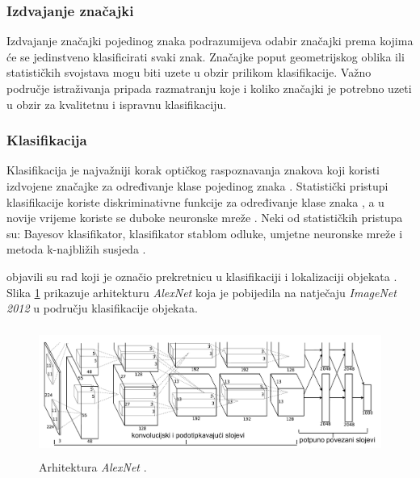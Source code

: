 \documentclass[times, utf8, zavrsni]{fer}
\begin{document}
\pagebreak

\subsubsection{Izdvajanje značajki}
Izdvajanje značajki pojedinog znaka podrazumijeva odabir značajki prema kojima
će se jedinstveno klasificirati svaki znak. Značajke poput geometrijskog oblika
ili statističkih svojstava mogu biti uzete u obzir prilikom klasifikacije.
Važno područje istraživanja pripada razmatranju koje i koliko značajki je
potrebno uzeti u obzir za kvalitetnu i ispravnu klasifikaciju.
\citep{DBLP:journals/corr/abs-1710-05703}


\subsubsection{Klasifikacija}
Klasifikacija je najvažniji korak optičkog raspoznavanja znakova
\citep{verma2012survey} \citep{zhu2016novel} koji koristi izdvojene značajke za
određivanje klase pojedinog znaka \citep{lehal1999feature}
\citep{kaur2016survey}. Statistički pristupi klasifikacije koriste
diskriminativne funkcije za određivanje klase znaka
\citep{DBLP:journals/corr/abs-1710-05703}, a u novije vrijeme koriste se duboke
neuronske mreže \citep{Jurin:2017:Master}. Neki od statističkih pristupa su:
Bayesov klasifikator, klasifikator stablom odluke, umjetne neuronske mreže i
metoda k-najbližih susjeda \citep{DBLP:journals/corr/abs-1710-05703}.

\citep{krizhevsky2012imagenet} objavili su rad koji je označio prekretnicu u
klasifikaciji i lokalizaciji objekata \citep{Jurin:2017:Master}. Slika
\ref{fig:deep-example-01} prikazuje arhitekturu \emph{AlexNet} koja je
pobijedila na natječaju \emph{ImageNet 2012} u području klasifikacije objekata.
\citep{Jurin:2017:Master}

\begin{figure}[!htb]
    \centering
    \includegraphics[height=4.2cm]{images/deep-example-01.png}
    \caption{Arhitektura \emph{AlexNet} \citep{Jurin:2017:Master}.}
    \label{fig:deep-example-01}
\end{figure}
\end{document}
